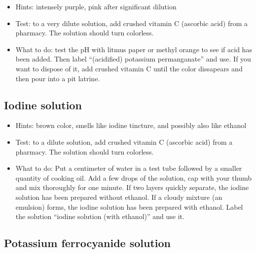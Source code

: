 \begin{itemize}

\item{Hints: intensely purple, 
pink after significant dilution}

\item{Test: to a very dilute solution, 
add crushed vitamin C (ascorbic acid) from a pharmacy. 
The solution should turn colorless.}

\item{What to do: test the pH with litmus paper 
or methyl orange to see if acid has been added. 
Then label “(acidified) potassium permanganate” and use. 
If you want to dispose of it, 
add crushed vitamin C until the color dissapears 
and then pour into a pit latrine.}

\end{itemize}

\subsection{Iodine solution}

\begin{itemize}

\item{Hints: brown color, 
smells like iodine tincture, 
and possibly also like ethanol}

\item{Test: to a dilute solution, 
add crushed vitamin C (ascorbic acid) from a pharmacy. 
The solution should turn colorless.}

\item{What to do: Put a centimeter of water in a test tube 
followed by a smaller quantity of cooking oil. 
Add a few drops of the solution, 
cap with your thumb and mix thoroughly for one minute. 
If two layers quickly separate, 
the iodine solution has been prepared without ethanol. 
If a cloudy mixture (an emulsion) forms, 
the iodine solution has been prepared with ethanol. 
Label the solution “iodine solution (with ethanol)” and use it.}

\end{itemize}

\subsection{Potassium ferrocyanide solution}

